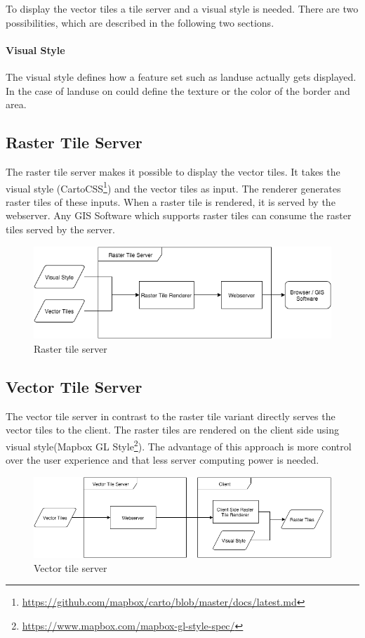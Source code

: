 To display the vector tiles a tile server and a visual style is needed. There are two possibilities, which are described in the following two sections.

\paragraph{Visual Style}
The visual style defines how a feature set such as landuse actually gets displayed. In the case of landuse on could define the texture or the color of the border and area.


\subsection{Raster Tile Server}

The raster tile server makes it possible to display the vector tiles. It takes the visual style (CartoCSS\footnote{\url{https://github.com/mapbox/carto/blob/master/docs/latest.md}}) and the vector tiles as input. The renderer generates raster tiles of these inputs. When a raster tile is rendered, it is served by the webserver. Any GIS Software which supports raster tiles can consume the raster tiles served by the server.

\begin{figure}[h]

  \centering
  \includegraphics[width=1\textwidth]{images/raster_tile_server.png}
  \caption{Raster tile server}
\end{figure}

\subsection{Vector Tile Server}

The vector tile server in contrast to the raster tile variant directly serves the vector tiles to the client. The raster tiles are rendered on the client side using visual style(Mapbox GL Style\footnote{\url{https://www.mapbox.com/mapbox-gl-style-spec/}}). The advantage of this approach is more control over the user experience and that less server computing power is needed.

\begin{figure}[h]

  \centering
  \includegraphics[width=1\textwidth]{images/vector_tile_server.png}
  \caption{Vector tile server}
\end{figure}

\newpage